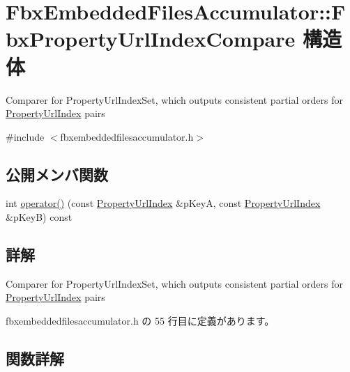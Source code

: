 \hypertarget{struct_fbx_embedded_files_accumulator_1_1_fbx_property_url_index_compare}{}\section{Fbx\+Embedded\+Files\+Accumulator\+:\+:Fbx\+Property\+Url\+Index\+Compare 構造体}
\label{struct_fbx_embedded_files_accumulator_1_1_fbx_property_url_index_compare}


Comparer for Property\+Url\+Index\+Set, which outputs consistent partial orders for \hyperlink{struct_fbx_embedded_files_accumulator_1_1_property_url_index}{Property\+Url\+Index} pairs  




{\ttfamily \#include $<$fbxembeddedfilesaccumulator.\+h$>$}

\subsection*{公開メンバ関数}
\begin{DoxyCompactItemize}
\item 
int \hyperlink{struct_fbx_embedded_files_accumulator_1_1_fbx_property_url_index_compare_a0b2f77a9b93ac4d2e435f5b8b15078a9}{operator()} (const \hyperlink{struct_fbx_embedded_files_accumulator_1_1_property_url_index}{Property\+Url\+Index} \&p\+KeyA, const \hyperlink{struct_fbx_embedded_files_accumulator_1_1_property_url_index}{Property\+Url\+Index} \&p\+KeyB) const
\end{DoxyCompactItemize}


\subsection{詳解}
Comparer for Property\+Url\+Index\+Set, which outputs consistent partial orders for \hyperlink{struct_fbx_embedded_files_accumulator_1_1_property_url_index}{Property\+Url\+Index} pairs 

 fbxembeddedfilesaccumulator.\+h の 55 行目に定義があります。



\subsection{関数詳解}
\mbox{\label{struct_fbx_embedded_files_accumulator_1_1_fbx_property_url_index_compare_a0b2f77a9b93ac4d2e435f5b8b15078a9}} 
